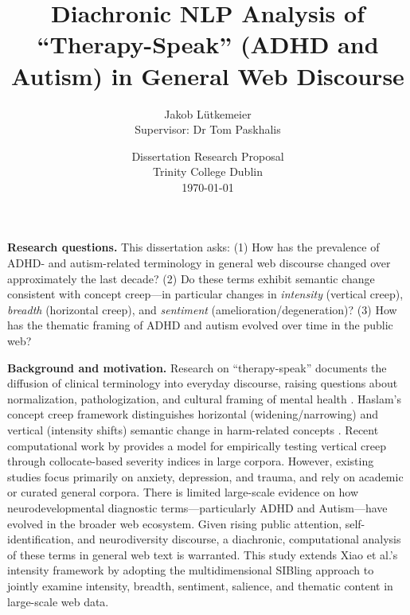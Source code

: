 \documentclass[12pt,letterpaper]{article}
\title{Diachronic NLP Analysis of ``Therapy-Speak'' (ADHD and Autism) in General Web Discourse}
\date{Dissertation Research Proposal \\ Trinity College Dublin \\ \today}
\author{Jakob Lütkemeier \\ Supervisor: Dr Tom Paskhalis}
\begin{document}
	\maketitle
	
	\textbf{Research questions.} This dissertation asks: (1) How has the prevalence of ADHD- and autism-related terminology in general web discourse changed over approximately the last decade? (2) Do these terms exhibit semantic change consistent with concept creep---in particular changes in \emph{intensity} (vertical creep), \emph{breadth} (horizontal creep), and \emph{sentiment} (amelioration/degeneration)? (3) How has the thematic framing of ADHD and autism evolved over time in the public web?
	
	\textbf{Background and motivation.} Research on ``therapy-speak'' documents the diffusion of clinical terminology into everyday discourse, raising questions about normalization, pathologization, and cultural framing of mental health \citep{isern-masUnmaskingTherapyspeak2025}. Haslam's concept creep framework distinguishes horizontal (widening/narrowing) and vertical (intensity shifts) semantic change in harm-related concepts \citep{haslamConceptCreepPsychologys2016,haslamHarmInflationMaking2020}. Recent computational work by \citet{xiaoHaveConceptsAnxiety2023} provides a model for empirically testing vertical creep through collocate-based severity indices in large corpora. However, existing studies focus primarily on anxiety, depression, and trauma, and rely on academic or curated general corpora. There is limited large-scale evidence on how neurodevelopmental diagnostic terms—particularly ADHD and Autism—have evolved in the broader web ecosystem. Given rising public attention, self-identification, and neurodiversity discourse, a diachronic, computational analysis of these terms in general web text is warranted. This study extends Xiao et al.’s intensity framework by adopting the multidimensional SIBling approach to jointly examine intensity, breadth, sentiment, salience, and thematic content in large-scale web data.
	
\end{document}
